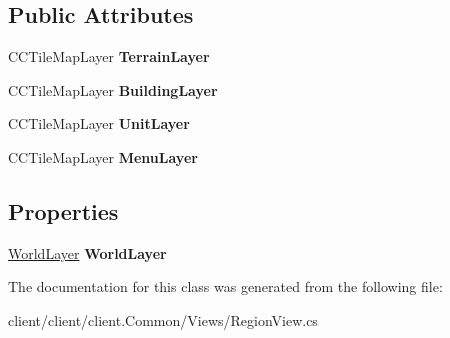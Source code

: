 \subsection*{Public Attributes}
\begin{DoxyCompactItemize}
\item 
\hypertarget{classClient_1_1Common_1_1Views_1_1RegionView_a64c96cc34da9b9d39eb6bd7fa4035994}{C\-C\-Tile\-Map\-Layer {\bfseries Terrain\-Layer}}\label{classClient_1_1Common_1_1Views_1_1RegionView_a64c96cc34da9b9d39eb6bd7fa4035994}

\item 
\hypertarget{classClient_1_1Common_1_1Views_1_1RegionView_a5ef2df453b1fe9f0b7b27dca874fb09e}{C\-C\-Tile\-Map\-Layer {\bfseries Building\-Layer}}\label{classClient_1_1Common_1_1Views_1_1RegionView_a5ef2df453b1fe9f0b7b27dca874fb09e}

\item 
\hypertarget{classClient_1_1Common_1_1Views_1_1RegionView_a6053b81859f53646ec9c8bb076b69e03}{C\-C\-Tile\-Map\-Layer {\bfseries Unit\-Layer}}\label{classClient_1_1Common_1_1Views_1_1RegionView_a6053b81859f53646ec9c8bb076b69e03}

\item 
\hypertarget{classClient_1_1Common_1_1Views_1_1RegionView_a17e05a2617be19c73a335324828b36ec}{C\-C\-Tile\-Map\-Layer {\bfseries Menu\-Layer}}\label{classClient_1_1Common_1_1Views_1_1RegionView_a17e05a2617be19c73a335324828b36ec}

\end{DoxyCompactItemize}
\subsection*{Properties}
\begin{DoxyCompactItemize}
\item 
\hypertarget{classClient_1_1Common_1_1Views_1_1RegionView_a5cba3dfb92a171fc8273c4838690450a}{\hyperlink{classClient_1_1Common_1_1Views_1_1WorldLayer}{World\-Layer} {\bfseries World\-Layer}}\label{classClient_1_1Common_1_1Views_1_1RegionView_a5cba3dfb92a171fc8273c4838690450a}

\end{DoxyCompactItemize}


The documentation for this class was generated from the following file\-:\begin{DoxyCompactItemize}
\item 
client/client/client.\-Common/\-Views/Region\-View.\-cs\end{DoxyCompactItemize}

